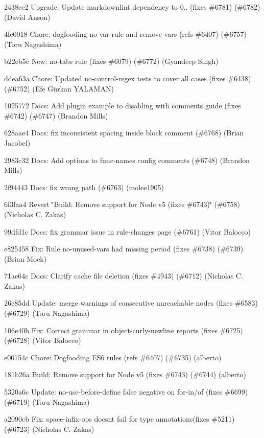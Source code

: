 \begin{DoxyItemize}
\item 2438ee2 Upgrade\+: Update markdownlint dependency to 0.. (fixes \#6781) (\#6782) (David Anson)
\item 4fc0018 Chore\+: dogfooding {\ttfamily no-\/var} rule and remove {\ttfamily var}s (refs \#6407) (\#6757) (Toru Nagashima)
\item b22eb5c New\+: {\ttfamily no-\/tabs} rule (fixes \#6079) (\#6772) (Gyandeep Singh)
\item ddea63a Chore\+: Updated no-\/control-\/regex tests to cover all cases (fixes \#6438) (\#6752) (Efe Gürkan Y\+A\+L\+A\+M\+AN)
\item 1025772 Docs\+: Add plugin example to disabling with comments guide (fixes \#6742) (\#6747) (Brandon Mills)
\item 628aae4 Docs\+: fix inconsistent spacing inside block comment (\#6768) (Brian Jacobel)
\item 2983c32 Docs\+: Add options to func-\/names config comments (\#6748) (Brandon Mills)
\item 2f94443 Docs\+: fix wrong path (\#6763) (molee1905)
\item 6f3faa4 Revert \char`\"{}\+Build\+: Remove support for Node v5 (fixes \#6743)\char`\"{} (\#6758) (Nicholas C. Zakas)
\item 99dfd1c Docs\+: fix grammar issue in rule-\/changes page (\#6761) (Vitor Balocco)
\item e825458 Fix\+: Rule no-\/unused-\/vars had missing period (fixes \#6738) (\#6739) (Brian Mock)
\item 71ae64c Docs\+: Clarify cache file deletion (fixes \#4943) (\#6712) (Nicholas C. Zakas)
\item 26c85dd Update\+: merge warnings of consecutive unreachable nodes (fixes \#6583) (\#6729) (Toru Nagashima)
\item 106e40b Fix\+: Correct grammar in object-\/curly-\/newline reports (fixes \#6725) (\#6728) (Vitor Balocco)
\item e00754c Chore\+: Dogfooding E\+S6 rules (refs \#6407) (\#6735) (alberto)
\item 181b26a Build\+: Remove support for Node v5 (fixes \#6743) (\#6744) (alberto)
\item 5320a6c Update\+: {\ttfamily no-\/use-\/before-\/define} false negative on for-\/in/of (fixes \#6699) (\#6719) (Toru Nagashima)
\item a2090cb Fix\+: space-\/infix-\/ops doesn\textquotesingle{}t fail for type annotations(fixes \#5211) (\#6723) (Nicholas C. Zakas)

\end{DoxyItemize}

